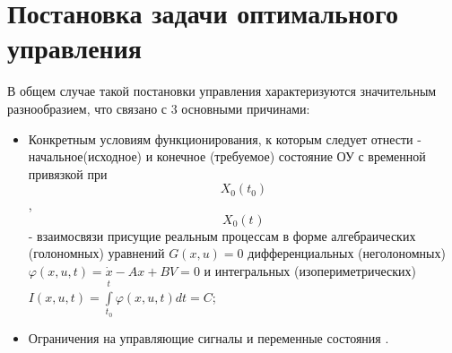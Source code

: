 \documentclass[preprint,russian,a5paper,10pt,twoside]{ncc}
\begin{document}
\newpage\mbox{}\newpage

\section{Постановка задачи оптимального управления\label{task}}
В общем случае такой постановки управления характеризуются значительным разнообразием, что связано с 3 основными причинами:

\begin{itemize}
\item Конкретным условиям функционирования, к которым следует отнести - начальное(исходное) и конечное (требуемое) состояние ОУ с временной привязкой при \[{{X}_{0}}\left( {{t}_{0}} \right)\], \[{{X}_{0}}\left( {{t}_{}} \right)\] - взаимосвязи присущие реальным процессам в форме алгебраических (голономных) уравнений $G\left( x,u \right)=0$ дифференциальных (неголономных) $\varphi \left( x,u,t \right)=\dot{x}-Ax+BV=0$ и интегральных (изопериметрических) $I\left( x,u,t \right)=\int\limits_{{{t}_{0}}}^{{{t}_{}}}{\varphi \left( x,u,t \right)dt=C}$;
\item Ограничения на управляющие сигналы и переменные состояния .
\end{itemize}
\par
\end{document}
